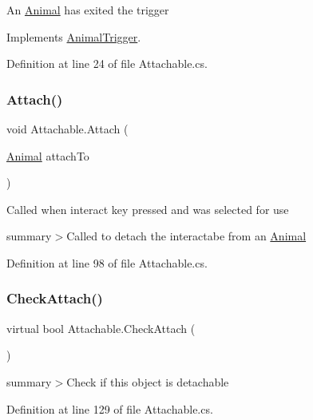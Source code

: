 An \mbox{\hyperlink{class_animal}{Animal}} has exited the trigger 



Implements \mbox{\hyperlink{class_animal_trigger_aa1a7c2e90de76c2e089b2bae01813f5c}{Animal\+Trigger}}.



Definition at line 24 of file Attachable.\+cs.

\mbox{\label{class_attachable_a4d8883f6f87f40cbe09ef20e50f84975}} 
\subsubsection{\texorpdfstring{Attach()}{Attach()}}
{\footnotesize\ttfamily void Attachable.\+Attach (\begin{DoxyParamCaption}\item[{\mbox{\hyperlink{class_animal}{Animal}}}]{attach\+To }\end{DoxyParamCaption})}



Called when interact key pressed and was selected for use

summary$>$Called to detach the interactabe from an \mbox{\hyperlink{class_animal}{Animal}}

Definition at line 98 of file Attachable.\+cs.

\mbox{\label{class_attachable_ab48b28f7aaf8a83d7b38d68c60ed1eff}} 
\subsubsection{\texorpdfstring{Check\+Attach()}{CheckAttach()}}
{\footnotesize\ttfamily virtual bool Attachable.\+Check\+Attach (\begin{DoxyParamCaption}{ }\end{DoxyParamCaption})\hspace{0.3cm}{\ttfamily [virtual]}}



summary$>$Check if this object is detachable



Definition at line 129 of file Attachable.\+cs.

\mbox{\label{class_attachable_a5cd6ea1bf16c527c033e6f09681f84f8}} 
